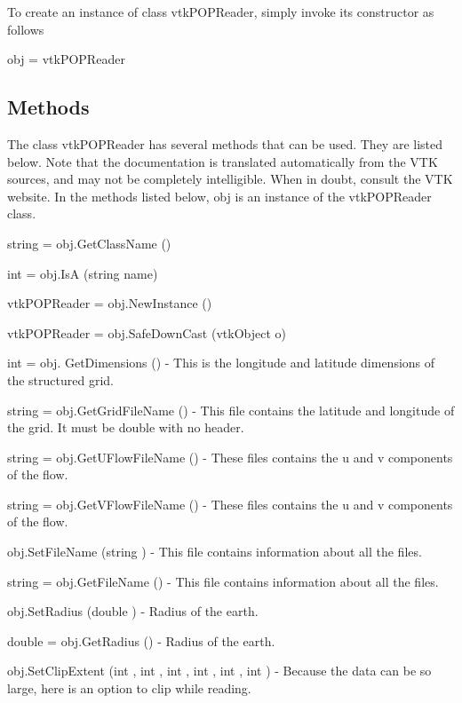 To create an instance of class vtk\-P\-O\-P\-Reader, simply invoke its constructor as follows \begin{DoxyVerb}  obj = vtkPOPReader
\end{DoxyVerb}
 \hypertarget{vtkwidgets_vtkxyplotwidget_Methods}{}\subsection{Methods}\label{vtkwidgets_vtkxyplotwidget_Methods}
The class vtk\-P\-O\-P\-Reader has several methods that can be used. They are listed below. Note that the documentation is translated automatically from the V\-T\-K sources, and may not be completely intelligible. When in doubt, consult the V\-T\-K website. In the methods listed below, {\ttfamily obj} is an instance of the vtk\-P\-O\-P\-Reader class. 
\begin{DoxyItemize}
\item {\ttfamily string = obj.\-Get\-Class\-Name ()}  
\item {\ttfamily int = obj.\-Is\-A (string name)}  
\item {\ttfamily vtk\-P\-O\-P\-Reader = obj.\-New\-Instance ()}  
\item {\ttfamily vtk\-P\-O\-P\-Reader = obj.\-Safe\-Down\-Cast (vtk\-Object o)}  
\item {\ttfamily int = obj. Get\-Dimensions ()} -\/ This is the longitude and latitude dimensions of the structured grid.  
\item {\ttfamily string = obj.\-Get\-Grid\-File\-Name ()} -\/ This file contains the latitude and longitude of the grid. It must be double with no header.  
\item {\ttfamily string = obj.\-Get\-U\-Flow\-File\-Name ()} -\/ These files contains the u and v components of the flow.  
\item {\ttfamily string = obj.\-Get\-V\-Flow\-File\-Name ()} -\/ These files contains the u and v components of the flow.  
\item {\ttfamily obj.\-Set\-File\-Name (string )} -\/ This file contains information about all the files.  
\item {\ttfamily string = obj.\-Get\-File\-Name ()} -\/ This file contains information about all the files.  
\item {\ttfamily obj.\-Set\-Radius (double )} -\/ Radius of the earth.  
\item {\ttfamily double = obj.\-Get\-Radius ()} -\/ Radius of the earth.  
\item {\ttfamily obj.\-Set\-Clip\-Extent (int , int , int , int , int , int )} -\/ Because the data can be so large, here is an option to clip while reading.  

\end{DoxyItemize}
